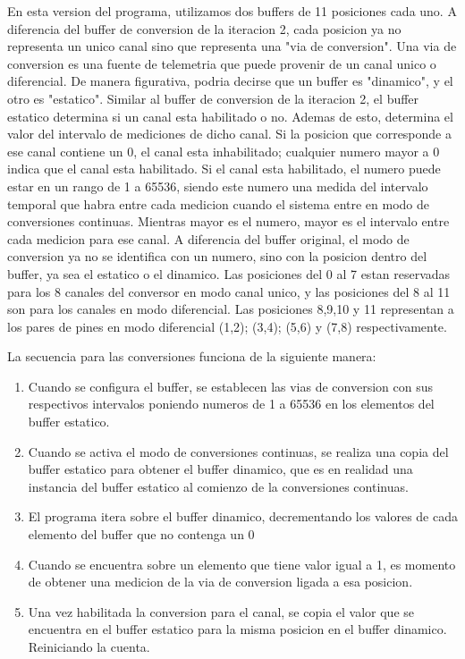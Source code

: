 En esta version del programa, utilizamos dos buffers de 11 posiciones cada uno. A diferencia del buffer de conversion de la iteracion 2, cada posicion ya no representa un unico canal sino que representa una "via de conversion". Una via de conversion es una fuente de telemetria que puede provenir de un canal unico o diferencial.
De manera figurativa, podria decirse que un buffer es "dinamico", y el otro es "estatico". Similar al buffer de conversion de la iteracion 2, el buffer estatico determina si un canal esta habilitado o no. Ademas de esto, determina el valor del intervalo de mediciones de dicho canal. Si la posicion que corresponde a ese canal contiene un 0, el canal esta inhabilitado; cualquier numero mayor a 0 indica que el canal esta habilitado. Si el canal esta habilitado, el numero puede estar en un rango de 1 a 65536, siendo este numero una medida del intervalo temporal que habra entre cada medicion cuando el sistema entre en modo de conversiones continuas. Mientras mayor es el numero, mayor es el intervalo entre cada medicion para ese canal.
A diferencia del buffer original, el modo de conversion ya no se identifica con un numero, sino con la posicion dentro del buffer, ya sea el estatico o el dinamico. Las posiciones del 0 al 7 estan reservadas para los 8 canales del conversor en modo canal unico, y las posiciones del 8 al 11 son para los canales en modo diferencial. Las posiciones 8,9,10 y 11 representan a los pares de pines en modo diferencial (1,2); (3,4); (5,6) y (7,8) respectivamente. 


La secuencia para las conversiones funciona de la siguiente manera:

\begin{enumerate}
\item Cuando se configura el buffer, se establecen las vias de conversion con sus respectivos intervalos poniendo numeros de 1 a 65536 en los elementos del buffer estatico.
\item Cuando se activa el modo de conversiones continuas, se realiza una copia del buffer estatico para obtener el buffer dinamico, que es en realidad una instancia del buffer estatico al comienzo de la conversiones continuas.
\item El programa itera sobre el buffer dinamico, decrementando los valores de cada elemento del buffer que no contenga un 0
\item Cuando se encuentra sobre un elemento que tiene valor igual a 1, es momento de obtener una medicion de la via de conversion ligada a esa posicion.
\item Una vez habilitada la conversion para el canal, se copia el valor que se encuentra en el buffer estatico para la misma posicion en el buffer dinamico. Reiniciando la cuenta.
\end{enumerate}

